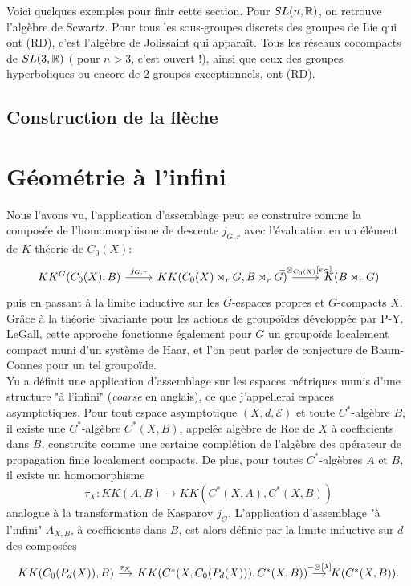 Voici quelques exemples pour finir cette section. Pour $SL(n,\mathbb R)$, on retrouve l'algèbre de Scwartz. Pour tous les sous-groupes discrets des groupes de Lie qui ont (RD), c'est l'algèbre de Jolissaint qui apparaît. Tous les réseaux cocompacts de $SL(3,\mathbb R)$ ( pour $n> 3$, c'est ouvert !), ainsi que ceux des groupes hyperboliques ou encore de $2$ groupes exceptionnels, ont (RD).  

\subsection{Construction de la flèche}
\section{Géométrie à l'infini}

Nous l'avons vu, l'application d'assemblage peut se construire comme la composée de l'homomorphisme de descente $j_{G,r}$ avec l'évaluation en un élément de $K$-théorie de $C_0(X)$:
\[\begin{tikzcd}
KK^G(C_0(X),B)\arrow{r}{j_{G,r}}& KK(C_0(X)\rtimes_r G,B \rtimes_r G) \arrow{r}{-\otimes_{C_0(X)} [e_G]} & K(B\rtimes_r G) 
\end{tikzcd}\]
puis en passant à la limite inductive sur les $G$-espaces propres et $G$-compacts $X$. Grâce à la théorie bivariante pour les actions de groupoïdes développée par P-Y. LeGall, cette approche fonctionne également pour $G$ un groupoïde localement compact muni d'un système de Haar, et l'on peut parler de conjecture de Baum-Connes pour un tel groupoïde.  \\

Yu a définit une application d'assemblage sur les espaces métriques munis d'une structure "à l'infini" (\textit{coarse} en anglais), ce que j'appellerai espaces asymptotiques. Pour tout espace asymptotique $(X,d,\mathcal E)$ et toute $C^*$-algèbre $B$, il existe une $C^*$-algèbre $C^*(X,B)$, appelée algèbre de Roe de $X$ à coefficients dans $B$, construite comme une certaine complétion de l'algèbre des opérateur de propagation finie localement compacts. De plus, pour toutes $C^*$-algèbres $A$ et $B$, il existe un homomorphisme
\[\tau_X : KK(A,B)\rightarrow KK(C^*(X,A),C^*(X,B))\]
analogue à la transformation de Kasparov $j_G$. L'application d'assemblage "à l'infini" $A_{X,B}$, à coefficients dans $B$, est alors définie par la limite inductive sur $d$ des composées
\[\begin{tikzcd}[column sep= small]
KK(C_0(P_d(X)),B)\arrow{r}{\tau_X}& KK(C^*(X,C_0(P_d(X))),C^*(X,B)) \arrow{r}{-\otimes [\lambda]} & K(C^*(X,B)) .
\end{tikzcd}\]

